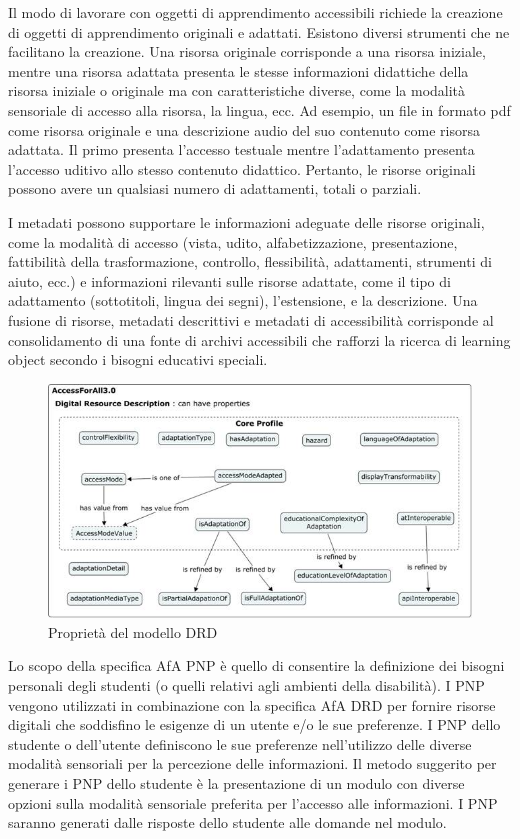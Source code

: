 Il modo di lavorare con oggetti di apprendimento accessibili richiede la creazione di oggetti di apprendimento originali e adattati. Esistono diversi strumenti che ne facilitano la creazione. Una risorsa originale corrisponde a una risorsa iniziale, mentre una risorsa adattata presenta le stesse informazioni didattiche della risorsa iniziale o originale ma con caratteristiche diverse, come la modalità sensoriale di accesso alla risorsa, la lingua, ecc. Ad esempio, un file in formato pdf come risorsa originale e una descrizione audio del suo contenuto come risorsa adattata. Il primo presenta l'accesso testuale mentre l'adattamento presenta l'accesso uditivo allo stesso contenuto didattico. Pertanto, le risorse originali possono avere un qualsiasi numero di adattamenti, totali o parziali.

I metadati possono supportare le informazioni adeguate delle risorse originali, come la modalità di accesso (vista, udito, alfabetizzazione, presentazione, fattibilità della trasformazione, controllo, flessibilità, adattamenti, strumenti di aiuto, ecc.) e informazioni rilevanti sulle risorse adattate, come il tipo di adattamento (sottotitoli, lingua dei segni), l'estensione, e la descrizione. Una fusione di risorse, metadati descrittivi e metadati di accessibilità corrisponde al consolidamento di una fonte di archivi accessibili che rafforzi la ricerca di learning object secondo i bisogni educativi speciali.

\begin{figure}[H]
\centering
\includegraphics[scale=0.7]{res/drd.png}
\caption{Proprietà del modello DRD}
\label{fig:drd}
\end{figure}

Lo scopo della specifica AfA PNP è quello di consentire la definizione dei bisogni personali degli studenti (o quelli relativi agli ambienti della disabilità). I PNP vengono utilizzati in combinazione con la specifica AfA DRD per fornire risorse digitali che soddisfino le esigenze di un utente e/o le sue preferenze. I PNP dello studente o dell'utente definiscono le sue preferenze nell'utilizzo delle diverse modalità sensoriali per la percezione delle informazioni. Il metodo suggerito per generare i PNP dello studente è la presentazione di un modulo con diverse opzioni sulla modalità sensoriale preferita per l'accesso alle informazioni. I PNP saranno generati dalle risposte dello studente alle domande nel modulo.

